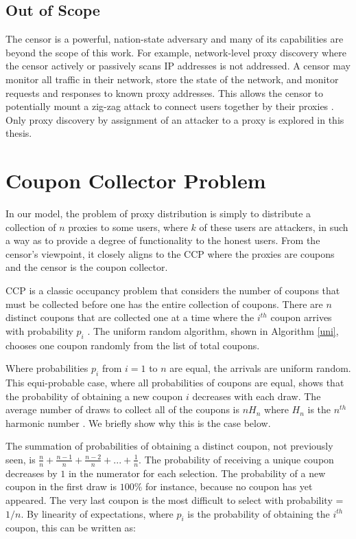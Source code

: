 \subsection{Out of Scope}

The censor is a powerful, nation-state adversary and many of its capabilities are beyond the scope of this work. For example, network-level proxy discovery where the censor actively or passively scans \ac{IP} addresses is not addressed. A censor may monitor all traffic in their network, store the state of the network, and monitor requests and responses to known proxy addresses. This allows the censor to potentially mount a zig-zag attack to connect users together by their proxies \cite{BRIDGEDISCO:2019}. Only proxy discovery by assignment of an attacker to a proxy is explored in this thesis.

\section{Coupon Collector Problem}

In our model, the problem of proxy distribution is simply to distribute a collection of $n$ proxies to some users, where $k$ of these users are attackers, in such a way as to provide a degree of functionality to the honest users. From the censor's viewpoint, it closely aligns to the \ac{CCP} where the proxies are coupons and the censor is the coupon collector.

\ac{CCP} is a classic occupancy problem that considers the number of coupons that must be collected before one has the entire collection of coupons. There are $n$ distinct coupons that are collected one at a time where the $i^{th}$ coupon arrives with probability $p_i$ \cite{motwani1995randomized}. The uniform random algorithm, shown in Algorithm \ref{uni}, chooses one coupon randomly from the list of total coupons.

Where probabilities $p_i$ from $i=1$ to $n$ are equal, the arrivals are uniform random. This equi-probable case, where all probabilities of coupons are equal, shows that the probability of obtaining a new coupon $i$ decreases with each draw. The average number of draws to collect all of the coupons is $nH_n$ where $H_n$ is the $n^{th}$ harmonic number \cite{flajolet1992birthday}. We briefly show why this is the case below. 

The summation of probabilities of obtaining a distinct coupon, not previously seen, is $\frac{n}{n} + \frac{n-1}{n} + \frac{n-2}{n} + ... + \frac{1}{n}$. The probability of receiving a unique coupon decreases by $1$ in the numerator for each selection. The probability of a new coupon in the first draw is $100\%$ for instance, because no coupon has yet appeared. The very last coupon is the most difficult to select with probability = $1/n$.
By linearity of expectations, where $p_i$ is the probability of obtaining the $i^{th}$ coupon, this can be written as:

